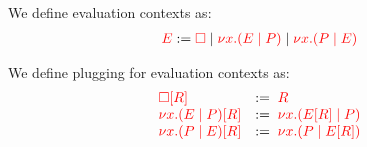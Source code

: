 \begin{definition}\label{def:cp-evaluation-contexts}
  We define evaluation contexts as:
  \begin{align*}
    \textcolor{red}{E} := \textcolor{red}{\Box}
    \mid \textcolor{red}{\nu x.(E \mid P)}
    \mid \textcolor{red}{\nu x.(P \mid E)}
  \end{align*}
\end{definition}
\begin{definition}[Plugging]\label{def:cp-evaluation-context-plugging}
  We define plugging for evaluation contexts as:
  \begin{gather*}
    \begin{array}{ll}
      \textcolor{red}{{\Box}[{R}]}            
      & := \; \textcolor{red}{R}
      \\
      \textcolor{red}{{\nu x.(E \mid P)}[{R}]}
      & := \; \textcolor{red}{\nu x.({E}[{R}] \mid P)}
      \\
      \textcolor{red}{{\nu x.(P \mid E)}[{R}]}
      & := \; \textcolor{red}{\nu x.(P \mid {E}[{R}])}
    \end{array}
  \end{gather*}
\end{definition}
